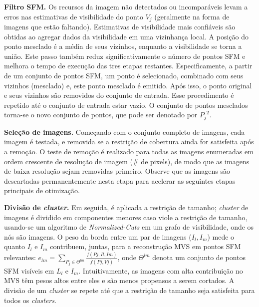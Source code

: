 \noindent\textbf{Filtro SFM.}
Os recursos
da imagem não detectados ou incomparáveis levam a erros nas estimativas de
visibilidade do ponto $V_j$ (geralmente na forma de imagens que estão faltando).
Estimativas de visibilidade mais confiáveis são obtidas ao agregar dados da
visibilidade em uma vizinhança local. A
posição do ponto mesclado é a média de seus vizinhos, enquanto a visibilidade se
torna a união. Este passo também reduz significativamente o número de pontos SFM
e melhora o tempo de execução das tres etapas restantes. Especificamente, a
partir de um conjunto de pontos SFM, um ponto é selecionado, combinado com seus
vizinhos (mesclado) e, este ponto mesclado é emitido. Após isso, o ponto
original e seus vizinhos são removidos do conjunto de entrada. Esse procedimento
é repetido até o conjunto de entrada estar vazio. O conjunto de pontos mesclados
torna-se o novo conjunto de pontos, que pode ser denotado por ${P_j}^2$.

\noindent\textbf{Seleção de imagens.}
Começando com o conjunto completo de imagens, cada imagem é testada, e removida
se a restrição de cobertura ainda for satisfeita após a remoção. O teste de
remoção é realizado para todas as imagens enumeradas em ordem crescente de
resolução de imagem (\# de pixels), de modo que as imagens de baixa resolução
sejam removidas primeiro. Observe que as imagens são descartadas permanentemente
nesta etapa para acelerar as seguintes etapas principais de otimização.

\noindent\textbf{Divisão de \emph{cluster}.}
Em seguida, é aplicada a restrição de tamanho; \emph{cluster} de imagens é
dividido em componentes menores caso viole a restrição de tamanho,
usando-se um algoritmo de \emph{Normalized-Cuts} %
em um grafo de visibilidade, onde os nós são imagens. O peso da borda entre um
par de imagens ($I_l, I_m$) mede o quanto $I_l$ e $I_m$ contribuem, juntas,
para a reconstrução MVS em pontos SFM relevantes: 
$e_{lm} = \sum_{P_j \in \Theta ^{lm}} \frac{f(Pj,{Il, Im})}{f(Pj, Vj )}$, onde
$\Theta ^{lm}$ denota um conjunto de pontos SFM visíveis em $L_l$ e $I_m$.
Intuitivamente, as imagens com alta contribuição no MVS têm pesos altos entre
eles e são menos propensos a serem cortados. A divisão de um \emph{cluster} se
repete até que a restrição de tamanho seja satisfeita para todos os
\emph{clusters}.

